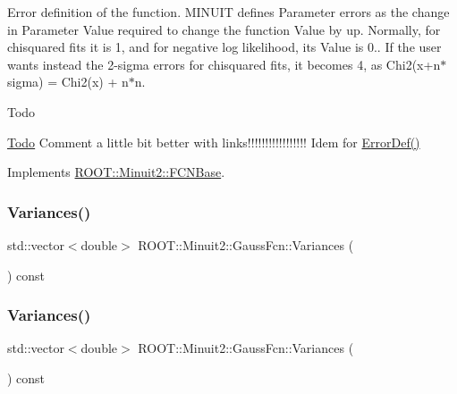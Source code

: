 Error definition of the function. M\+I\+N\+U\+IT defines Parameter errors as the change in Parameter Value required to change the function Value by up. Normally, for chisquared fits it is 1, and for negative log likelihood, its Value is 0.. If the user wants instead the 2-\/sigma errors for chisquared fits, it becomes 4, as Chi2(x+n$\ast$sigma) = Chi2(x) + n$\ast$n.

\begin{DoxyRefDesc}{Todo}
\item[\mbox{\hyperlink{todo__todo000001}{Todo}}]Comment a little bit better with links!!!!!!!!!!!!!!!!! Idem for \mbox{\hyperlink{classROOT_1_1Minuit2_1_1FCNBase_ac4592475c58a65b037ba97ab5f3cba10}{Error\+Def()}}\end{DoxyRefDesc}


Implements \mbox{\hyperlink{classROOT_1_1Minuit2_1_1FCNBase_a04ef08ddad92ce8d89d498efbe021c39}{R\+O\+O\+T\+::\+Minuit2\+::\+F\+C\+N\+Base}}.

\mbox{\label{classROOT_1_1Minuit2_1_1GaussFcn_a477d37158239fe260003624d12e8379a}} 
\subsubsection{\texorpdfstring{Variances()}{Variances()}\hspace{0.1cm}{\footnotesize\ttfamily [1/2]}}
{\footnotesize\ttfamily std\+::vector$<$double$>$ R\+O\+O\+T\+::\+Minuit2\+::\+Gauss\+Fcn\+::\+Variances (\begin{DoxyParamCaption}{ }\end{DoxyParamCaption}) const\hspace{0.3cm}{\ttfamily [inline]}}

\mbox{\label{classROOT_1_1Minuit2_1_1GaussFcn_a477d37158239fe260003624d12e8379a}} 
\subsubsection{\texorpdfstring{Variances()}{Variances()}\hspace{0.1cm}{\footnotesize\ttfamily [2/2]}}
{\footnotesize\ttfamily std\+::vector$<$double$>$ R\+O\+O\+T\+::\+Minuit2\+::\+Gauss\+Fcn\+::\+Variances (\begin{DoxyParamCaption}{ }\end{DoxyParamCaption}) const\hspace{0.3cm}{\ttfamily [inline]}}



